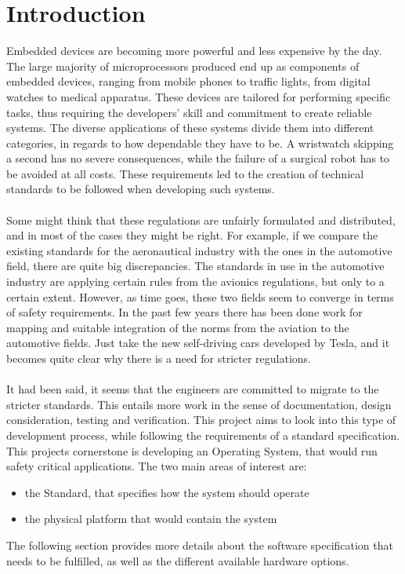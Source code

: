 \chapter{Introduction}\label{ch:introduction} 

Embedded devices are becoming more powerful and less expensive by the day. The large majority of
microprocessors produced end up as components of embedded devices, ranging from mobile phones
to traffic lights, from digital watches to medical apparatus. These devices are tailored for 
performing specific tasks, thus requiring the developers' skill and commitment to create reliable
systems. The diverse applications of these systems divide them into different categories, in regards to
how dependable they have to be. A wristwatch skipping a second has no severe consequences, while the
failure of a surgical robot has to be avoided at all costs. These requirements led to the creation 
of technical standards to be followed when developing such systems. 
\\\\
Some might think that these regulations are unfairly formulated and distributed, and in most
of the cases they might be right. For example, if we compare the existing standards for the aeronautical industry with the ones in the automotive field, there are quite big discrepancies. The standards 
in use in the automotive industry are applying certain rules from the avionics regulations, 
but only to a certain extent.
However, as time goes, these two fields seem to converge in terms of safety requirements. 
In the past few years there has been done work for mapping and suitable integration 
of the norms from the aviation to the automotive fields. Just take the new self-driving 
cars developed by Tesla, and it becomes quite clear why there is a need for stricter regulations. 
\\\\
It had been said, it seems that the engineers are committed to migrate to the stricter standards. 
This entails more work in the sense of documentation, design consideration, testing and verification.
This project aims to look into this type of development process, while following the requirements 
of a standard specification.
This project\textquotesingle s cornerstone is developing an Operating System, that would run safety critical 
applications. The two main areas of interest are:
\begin{itemize}
\item the Standard, that specifies how the system should operate
\item the physical platform that would contain the system
\end{itemize}
The following section provides more details about the software specification that needs to be fulfilled,
as well as the different available hardware options.